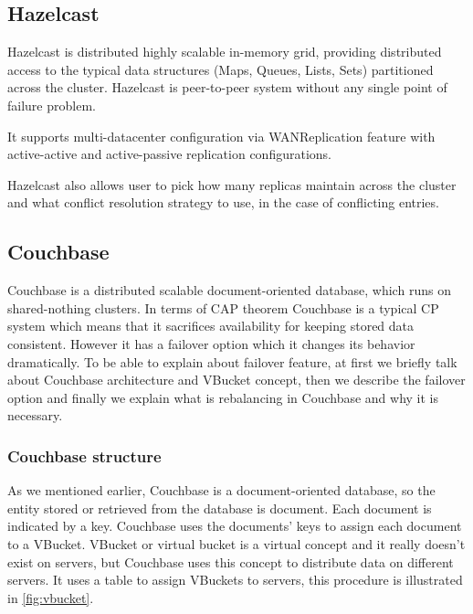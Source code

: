 \documentclass[a4paper]{article}
\begin{document}
\subsection*{Hazelcast}
Hazelcast is distributed highly scalable in-memory grid, providing distributed access to the typical data structures (Maps, Queues, Lists, Sets) partitioned across the cluster. 
Hazelcast is peer-to-peer system without any single point of failure problem.

It supports multi-datacenter configuration via WANReplication feature with active-active and active-passive replication configurations.

Hazelcast also allows user to pick how many replicas maintain across the cluster and what conflict resolution strategy to use, in the case of conflicting entries.  

\subsection*{Couchbase}

Couchbase is a distributed scalable document-oriented database, which runs on shared-nothing clusters.
In terms of CAP theorem Couchbase is a typical CP system which means that it sacrifices availability for keeping stored data consistent.
 However it has a failover option which it changes its behavior dramatically. 
To be able to explain about failover feature, at first we briefly talk about Couchbase architecture and VBucket concept, then we describe the failover option and finally we explain what is rebalancing in Couchbase and why it is necessary.


\subsubsection*{Couchbase structure}
As we mentioned earlier, Couchbase is a document-oriented database, so the entity stored or retrieved from the database is document. 
Each document is indicated by a key.
Couchbase uses the documents’ keys to assign each document to a VBucket. 
VBucket or virtual bucket is a virtual concept and it really doesn’t exist on servers, but Couchbase uses this concept to distribute data on different servers. 
It uses a table to assign VBuckets to servers, this procedure is illustrated in \ref{fig:vbucket}.
\end{document}
